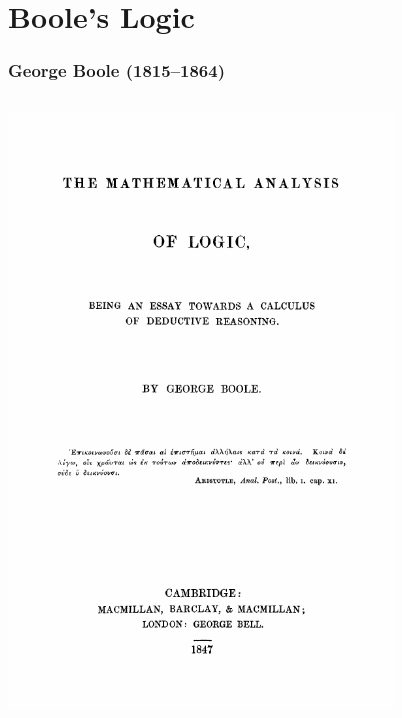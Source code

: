 \documentclass[compress,12pt]{beamer}
\begin{document}
\section{Boole's Logic}

\begin{frame}
    \frametitle{George Boole (1815--1864)}
    \begin{columns}
        \begin{column}{0.5\textwidth}
            \begin{center}
                \includegraphics[width=0.8\textwidth]{amal}
            \end{center}
        \end{column}
        \begin{column}{0.5\textwidth}
            \begin{center}

\end{center}
\end{column}
\end{columns}
\end{frame}
\end{document}
